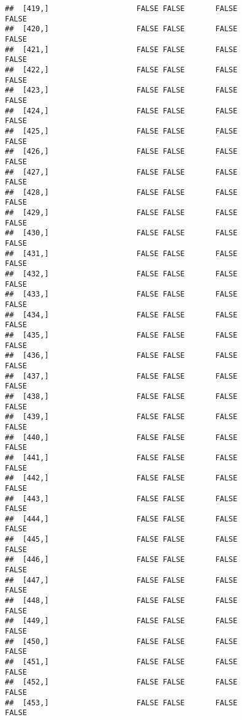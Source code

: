 \documentclass[
]{article}
\begin{document}
\begin{verbatim}
##  [419,]                    FALSE FALSE       FALSE                FALSE
##  [420,]                    FALSE FALSE       FALSE                FALSE
##  [421,]                    FALSE FALSE       FALSE                FALSE
##  [422,]                    FALSE FALSE       FALSE                FALSE
##  [423,]                    FALSE FALSE       FALSE                FALSE
##  [424,]                    FALSE FALSE       FALSE                FALSE
##  [425,]                    FALSE FALSE       FALSE                FALSE
##  [426,]                    FALSE FALSE       FALSE                FALSE
##  [427,]                    FALSE FALSE       FALSE                FALSE
##  [428,]                    FALSE FALSE       FALSE                FALSE
##  [429,]                    FALSE FALSE       FALSE                FALSE
##  [430,]                    FALSE FALSE       FALSE                FALSE
##  [431,]                    FALSE FALSE       FALSE                FALSE
##  [432,]                    FALSE FALSE       FALSE                FALSE
##  [433,]                    FALSE FALSE       FALSE                FALSE
##  [434,]                    FALSE FALSE       FALSE                FALSE
##  [435,]                    FALSE FALSE       FALSE                FALSE
##  [436,]                    FALSE FALSE       FALSE                FALSE
##  [437,]                    FALSE FALSE       FALSE                FALSE
##  [438,]                    FALSE FALSE       FALSE                FALSE
##  [439,]                    FALSE FALSE       FALSE                FALSE
##  [440,]                    FALSE FALSE       FALSE                FALSE
##  [441,]                    FALSE FALSE       FALSE                FALSE
##  [442,]                    FALSE FALSE       FALSE                FALSE
##  [443,]                    FALSE FALSE       FALSE                FALSE
##  [444,]                    FALSE FALSE       FALSE                FALSE
##  [445,]                    FALSE FALSE       FALSE                FALSE
##  [446,]                    FALSE FALSE       FALSE                FALSE
##  [447,]                    FALSE FALSE       FALSE                FALSE
##  [448,]                    FALSE FALSE       FALSE                FALSE
##  [449,]                    FALSE FALSE       FALSE                FALSE
##  [450,]                    FALSE FALSE       FALSE                FALSE
##  [451,]                    FALSE FALSE       FALSE                FALSE
##  [452,]                    FALSE FALSE       FALSE                FALSE
##  [453,]                    FALSE FALSE       FALSE                FALSE

\end{verbatim}
\end{document}
